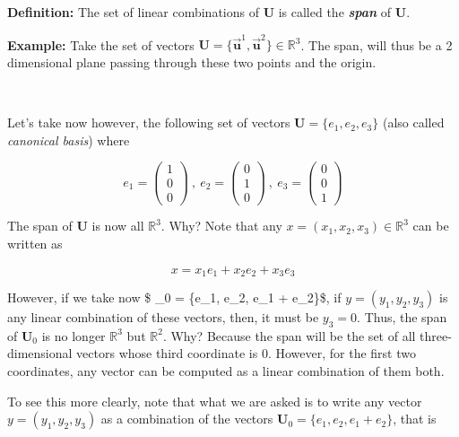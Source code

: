 \documentclass[11pt]{article}
\begin{document}
\textbf{Definition:} The set of linear combinations of \(\mathbf{U}\) is
called the \textbf{\emph{span}} of \(\mathbf{U}\).

\textbf{Example:} Take the set of vectors
\(\mathbf{U} = \{\vec{\mathbf{u}}^1, \vec{\mathbf{u}}^2\} \in\mathbb{R}^3\).
The span, will thus be a 2 dimensional plane passing through these two
points and the origin.

    \begin{center}
    \end{center}
    { \hspace*{\fill} \\}
    
    Let's take now however, the following set of vectors
\(\mathbf{U} = \{e_1, e_2, e_3\}\) (also called \emph{canonical basis})
where

\[
e_1 = \begin{pmatrix} 1 \\ 0 \\ 0 \end{pmatrix} \: , \: e_2 = \begin{pmatrix} 0 \\ 1 \\ 0 \end{pmatrix} \: , \: e_3 = \begin{pmatrix}  0 \\ 0 \\ 1 \end{pmatrix}
\]

The span of \(\mathbf{U}\) is now all \(\mathbb{R}^3\). Why? Note that
any \(x = (x_1, x_2, x_3)\in\mathbb{R}^3\) can be written as

\[
x = x_1 e_1 + x_2 e_2 + x_3 e_3
\]

However, if we take now \$ \_0 = \{e\_1, e\_2, e\_1 +
e\_2\}\$, if \(y = (y_1, y_2, y_3)\) is any linear combination of these
vectors, then, it must be \(y_3 = 0\). Thus, the span of
\(\mathbf{U}_0\) is no longer \(\mathbb{R}^3\) but \(\mathbb{R}^2\).
Why? Because the span will be the set of all three-dimensional vectors
whose third coordinate is \(0\). However, for the first two coordinates,
any vector can be computed as a linear combination of them both.

To see this more clearly, note that what we are asked is to write any
vector \(y = (y_1, y_2, y_3)\) as a combination of the vectors
\(\mathbf{U}_0 = \{e_1, e_2, e_1 + e_2\}\), that is
\end{document}
